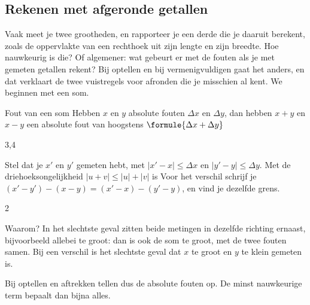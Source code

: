 \begin{oefeningen}
\end{oefeningen}

\subsection{Rekenen met afgeronde getallen}\label{sec:h3-rekenen}

Vaak meet je twee grootheden, en rapporteer je een derde die je daaruit berekent, zoals de oppervlakte van een rechthoek uit zijn lengte en zijn breedte. Hoe nauwkeurig is die? Of algemener: wat gebeurt er met de fouten als je met gemeten getallen rekent? Bij optellen en bij vermenigvuldigen gaat het anders, en dat verklaart de twee vuistregels voor afronden die je misschien al kent. We beginnen met een som.

\begin{theorie}
\begin{stelling}{Fout van een som}
Hebben $x$ en $y$ absolute fouten $\Delta x$ en $\Delta y$, dan hebben $x + y$ en $x - y$ een absolute fout van hoogstens \qquad $\formule{\Delta x + \Delta y}$
\end{stelling}

\begin{alleenvoor}{3,4}
\begin{bewijs}
Stel dat je $x'$ en $y'$ gemeten hebt, met $|x' - x| \leqslant \Delta x$ en $|y' - y| \leqslant \Delta y$. Met de driehoeksongelijkheid $|u + v| \leqslant |u| + |v|$ is
Voor het verschil schrijf je $(x' - y') - (x - y) = (x' - x) - (y' - y)$, en vind je dezelfde grens.
\end{bewijs}
\end{alleenvoor}
\end{theorie}
\begin{alleenvoor}{2}

Waarom? In het slechtste geval zitten beide metingen in dezelfde richting ernaast, bijvoorbeeld allebei te groot: dan is ook de som te groot, met de twee fouten samen. Bij een verschil is het slechtste geval dat $x$ te groot en $y$ te klein gemeten is.
\end{alleenvoor}

Bij optellen en aftrekken tellen dus de absolute fouten op. De minst nauwkeurige term bepaalt dan bijna alles.


